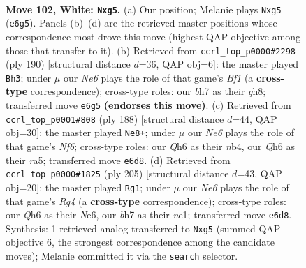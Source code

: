 \documentclass[11pt]{article}
\begin{document}
\clearpage

\begin{figure}[p]\centering
\begin{subfigure}{0.46\textwidth}\centering
\resizebox{\linewidth}{!}{%
\newchessgame
\chessboard[
  setfen={8/7b/4N2Q/4k1n1/1p6/4K3/4B3/8 w - - 4 102},
  showmover=false,
  pgfstyle=straightmove, color=movearrow, markmove={e6-g5}
]}
\caption{}
\end{subfigure}\hfill
\begin{subfigure}{0.46\textwidth}\centering
\resizebox{\linewidth}{!}{%
\newchessgame
\chessboard[
  setfen={7q/5k2/8/8/1p6/3b2N1/3Q3K/5B2 w - - 16 96},
  showmover=false,
  pgfstyle=straightmove, color=movearrow, markmove={f1-h3}
]}
\caption{}
\end{subfigure}
\\[4pt]
\begin{subfigure}{0.46\textwidth}\centering
\resizebox{\linewidth}{!}{%
\newchessgame
\chessboard[
  setfen={8/6k1/3K1N2/r2B4/1n6/8/8/8 w - - 28 95},
  showmover=false,
  pgfstyle=straightmove, color=movearrow, markmove={f6-e8}
]}
\caption{}
\end{subfigure}\hfill
\begin{subfigure}{0.46\textwidth}\centering
\resizebox{\linewidth}{!}{%
\newchessgame
\chessboard[
  setfen={5N2/8/4n3/6r1/4k2K/8/8/4N3 b - - 81 103},
  showmover=false,
  pgfstyle=straightmove, color=movearrow, markmove={g5-g1}
]}
\caption{}
\end{subfigure}
\caption{\textbf{Move 102, White: \texttt{Nxg5}.} (a) Our position; Melanie plays \texttt{Nxg5} (\texttt{e6g5}). Panels (b)--(d) are the retrieved master positions whose correspondence most drove this move (highest QAP objective among those that transfer to it). (b) Retrieved from \texttt{ccrl\_top\_p0000\#2298} (ply 190) [structural distance $d$=36, QAP obj=6]: the master played \texttt{Bh3}; under $\mu$ our \emph{Ne6} plays the role of that game's \emph{Bf1} (a \textbf{cross-type} correspondence); cross-type roles: our \emph{b}h7 as their \emph{q}h8; transferred move \texttt{e6g5} \textbf{(endorses this move)}. (c) Retrieved from \texttt{ccrl\_top\_p0001\#808} (ply 188) [structural distance $d$=44, QAP obj=30]: the master played \texttt{Ne8+}; under $\mu$ our \emph{Ne6} plays the role of that game's \emph{Nf6}; cross-type roles: our \emph{Q}h6 as their \emph{n}b4, our \emph{Q}h6 as their \emph{r}a5; transferred move \texttt{e6d8}. (d) Retrieved from \texttt{ccrl\_top\_p0000\#1825} (ply 205) [structural distance $d$=43, QAP obj=20]: the master played \texttt{Rg1}; under $\mu$ our \emph{Ne6} plays the role of that game's \emph{Rg4} (a \textbf{cross-type} correspondence); cross-type roles: our \emph{Q}h6 as their \emph{N}e6, our \emph{b}h7 as their \emph{n}e1; transferred move \texttt{e6d8}. Synthesis: 1 retrieved analog transferred to \texttt{Nxg5} (summed QAP objective 6, the strongest correspondence among the candidate moves); Melanie committed it via the \texttt{search} selector.}
\label{fig:thought-m202}
\end{figure}
\end{document}

